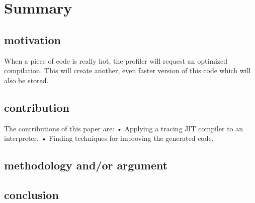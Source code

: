 \section{Summary}

\subsection{motivation}
When a piece of code is really hot, the profiler will request an optimized compilation. This will create another, even faster version of this code which will also be stored.
\subsection{contribution}
The contributions of this paper are:
• Applying a tracing JIT compiler to an interpreter.
• Finding techniques for improving the generated code.
\subsection{methodology and/or argument}
\subsection{conclusion}

\cite{bolz2009tracing}